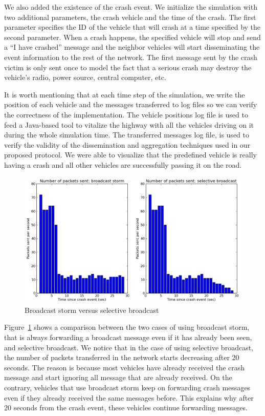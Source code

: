\documentclass{IEEEtran}
\begin{document}
We also added the existence of the crash event. We initialize the simulation with two additional parameters, the crash vehicle and the time of the crash. The first parameter specifies the ID of the vehicle that will crash at a time specified by the second parameter.
When a crash happens, the specified vehicle will stop and send a ``I have crashed'' message and the neighbor vehicles will start disseminating the event information to the rest of the network.
The first message sent by the crash victim is only sent once to model the fact that a serious crash may destroy the vehicle's radio, power source, central computer, etc.

It is worth mentioning that at each time step of the simulation, we write the position of each vehicle and the messages transferred to log files so we can verify the correctness of the implementation.
The vehicle positions log file is used to feed a Java-based tool to vitalize the highway with all the vehicles driving on it during the whole simulation time.
The transferred messages log file, is used to verify the validity of the dissemination and aggregation techniques used in our proposed protocol.
We were able to visualize that the predefined vehicle is really having a crash and all other vehicles are successfully passing it on the road.

\noindent
\begin{figure}[h]
\centering
\includegraphics[scale=0.32]{Figure_01.png}
\caption{Broadcast storm versus selective broadcast}
\label{fig_storm_nostorm}
\end{figure}

Figure~\ref{fig_storm_nostorm} shows a comparison between the two cases of using broadcast storm, that is always forwarding a broadcast message even if it has already been seen, and selective broadcast.
We notice that in the case of using selective broadcast, the number of packets transferred in the network starts decreasing after 20 seconds.
The reason is because most vehicles have already received the crash message and start ignoring all message that are already received. On the contrary, vehicles that use broadcast storm keep on forwarding crash messages even if they already received the same messages before.
This explains why after 20 seconds from the crash event, these vehicles continue forwarding messages.
\end{document}
